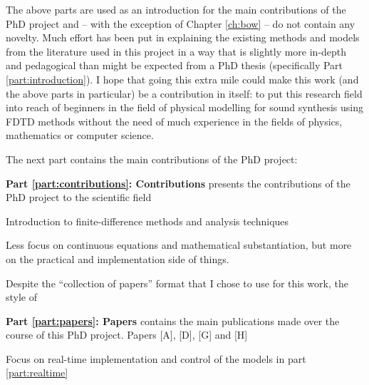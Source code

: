 The above parts are used as an introduction for the main contributions of the PhD project and -- with the exception of Chapter \ref{ch:bow} -- do not contain any novelty. Much effort has been put in explaining the existing methods and models from the literature used in this project in a way that is slightly more in-depth and pedagogical than might be expected from a PhD thesis (specifically Part \ref{part:introduction}). I hope that going this extra mile could make this work (and the above parts in particular) be a contribution in itself: to put this research field into reach of beginners in the field of physical modelling for sound synthesis using FDTD methods without the need of much experience in the fields of physics, mathematics or computer science.

The next part contains the main contributions of the PhD project:

\textbf{Part \ref{part:contributions}: Contributions} presents the contributions of the PhD project to the scientific field 

Introduction to finite-difference methods and analysis techniques

Less focus on continuous equations and mathematical substantiation, but more on the practical and implementation side of things.

Despite the ``collection of papers'' format that I chose to use for this work, the style of  

\textbf{Part \ref{part:papers}: Papers} contains the main publications made over the course of this PhD project. Papers [A], [D], [G] and [H] 

Focus on real-time implementation and control of the models in part \ref{part:realtime}

